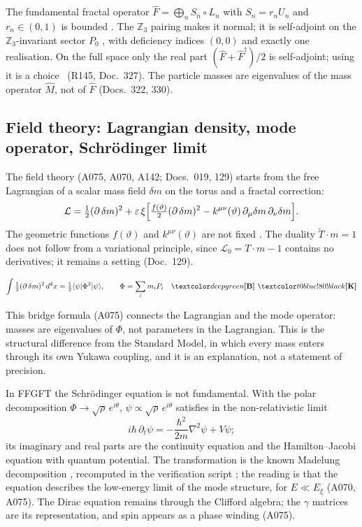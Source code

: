 The fundamental fractal operator $\hat F=\bigoplus_n S_n\circ L_n$ with $S_n=r_nU_n$ and
$r_n\in(0,1)$ is bounded \BM. The $\mathbb Z_3$ pairing makes it normal; it is self-adjoint on the
$\mathbb Z_3$-invariant sector $P_0$ \BM, with deficiency indices $(0,0)$ and exactly one
realisation. On the full space only the real part $(\hat F+\hat F^\dagger)/2$ is self-adjoint;
using it is a choice \SM\ (R145, Doc.~327). The particle masses are eigenvalues of the mass
operator $\hat M$, not of $\hat F$ (Docs.~322, 330).

\subsection{Field theory: Lagrangian density, mode operator, Schrödinger limit}

The field theory (A075, A070, A142; Docs.~019, 129) starts from the free Lagrangian of a scalar
mass field $\delta m$ on the torus and a fractal correction:
\begin{equation}
  \mathcal L=\tfrac12(\partial\,\delta m)^2
  +\varepsilon\,\xi\Bigl[\tfrac{f(\vartheta)}{2}(\partial\,\delta m)^2
  -k^{\mu\nu}(\vartheta)\,\partial_\mu\delta m\,\partial_\nu\delta m\Bigr].
\end{equation}
The geometric functions $f(\vartheta)$ and $k^{\mu\nu}(\vartheta)$ are not fixed \SM. The duality
$\tilde T\cdot m=1$ does not follow from a variational principle, since $\mathcal L_0=T\cdot m-1$
contains no derivatives; it remains a setting (Doc.~129).

\begin{ffkern}
\begin{equation}
  \int\tfrac12(\partial\,\delta m)^2\,d^4x=\tfrac12\langle\psi|\Phi^2|\psi\rangle,
  \qquad \Phi=\sum_i m_i P_i \quad\BM\ \KM
\end{equation}
\end{ffkern}%
This bridge formula (A075) connects the Lagrangian and the mode operator: masses are eigenvalues
of $\Phi$, not parameters in the Lagrangian. This is the structural difference from the Standard
Model, in which every mass enters through its own Yukawa coupling, and it is an explanation, not
a statement of precision.

In FFGFT the Schrödinger equation is not fundamental. With the polar decomposition
$\Phi\to\sqrt\rho\,e^{i\theta}$, $\psi\propto\sqrt\rho\,e^{i\theta}$ satisfies in the
non-relativistic limit
\begin{equation}
  i\hbar\,\partial_t\psi=-\frac{\hbar^2}{2m}\nabla^2\psi+V\psi ;
\end{equation}
its imaginary and real parts are the continuity equation and the Hamilton--Jacobi equation with
quantum potential. The transformation is the known Madelung decomposition \QM, recomputed in the
verification script \KM; the reading is that the equation describes the low-energy limit of the
mode structure, for $E\ll E_\xi$ (A070, A075). The Dirac equation remains through the Clifford
algebra; the $\gamma$ matrices are its representation, and spin appears as a phase winding
(A075).

